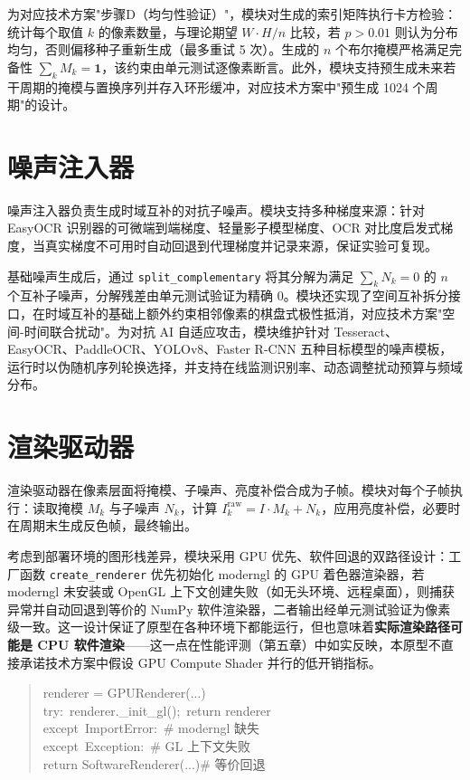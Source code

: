 为对应技术方案"步骤D（均匀性验证）"，模块对生成的索引矩阵执行卡方检验：统计每个取值 $k$ 的像素数量，与理论期望 $W\cdot H/n$ 比较，若 $p > 0.01$ 则认为分布均匀，否则偏移种子重新生成（最多重试 5 次）。生成的 $n$ 个布尔掩模严格满足完备性 $\sum_k M_k = \mathbf{1}$，该约束由单元测试逐像素断言。此外，模块支持预生成未来若干周期的掩模与置换序列并存入环形缓冲，对应技术方案中"预生成 1024 个周期"的设计。

\section{噪声注入器}

噪声注入器负责生成时域互补的对抗子噪声。模块支持多种梯度来源：针对 EasyOCR 识别器的可微端到端梯度、轻量影子模型梯度、OCR 对比度启发式梯度，当真实梯度不可用时自动回退到代理梯度并记录来源，保证实验可复现。

基础噪声生成后，通过 \verb|split_complementary| 将其分解为满足 $\sum_k N_k = 0$ 的 $n$ 个互补子噪声，分解残差由单元测试验证为精确 0。模块还实现了空间互补拆分接口，在时域互补的基础上额外约束相邻像素的棋盘式极性抵消，对应技术方案"空间-时间联合扰动"。为对抗 AI 自适应攻击，模块维护针对 Tesseract、EasyOCR、PaddleOCR、YOLOv8、Faster R-CNN 五种目标模型的噪声模板，运行时以伪随机序列轮换选择，并支持在线监测识别率、动态调整扰动预算与频域分布。

\section{渲染驱动器}

渲染驱动器在像素层面将掩模、子噪声、亮度补偿合成为子帧。模块对每个子帧执行：读取掩模 $M_k$ 与子噪声 $N_k$，计算 $I_k^{\text{raw}} = I \cdot M_k + N_k$，应用亮度补偿，必要时在周期末生成反色帧，最终输出。

考虑到部署环境的图形栈差异，模块采用 GPU 优先、软件回退的双路径设计：工厂函数 \verb|create_renderer| 优先初始化 moderngl 的 GPU 着色器渲染器，若 moderngl 未安装或 OpenGL 上下文创建失败（如无头环境、远程桌面），则捕获异常并自动回退到等价的 NumPy 软件渲染器，二者输出经单元测试验证为像素级一致。这一设计保证了原型在各种环境下都能运行，但也意味着\textbf{实际渲染路径可能是 CPU 软件渲染}——这一点在性能评测（第五章）中如实反映，本原型不直接承诺技术方案中假设 GPU Compute Shader 并行的低开销指标。

\begin{quote}\small\ttfamily
renderer = GPURenderer(...) \\
try:\ renderer.\_init\_gl();\ return renderer \\
except\ ImportError:\ \# moderngl 缺失 \\
except\ Exception:\ \# GL 上下文失败 \\
\quad return SoftwareRenderer(...)\quad\# 等价回退
\end{quote}

